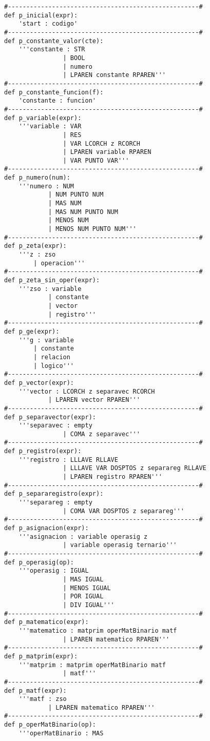 \begin{verbatim}
#----------------------------------------------------#
def p_inicial(expr):
	'start : codigo'
#----------------------------------------------------#
def p_constante_valor(cte):
	'''constante : STR	
				| BOOL
				| numero
				| LPAREN constante RPAREN'''
#----------------------------------------------------#
def p_constante_funcion(f):
	'constante : funcion'
#----------------------------------------------------#
def p_variable(expr):
	'''variable : VAR
				| RES
				| VAR LCORCH z RCORCH
				| LPAREN variable RPAREN
				| VAR PUNTO VAR'''
#----------------------------------------------------#
def p_numero(num):
	'''numero : NUM
			| NUM PUNTO NUM
			| MAS NUM
			| MAS NUM PUNTO NUM
			| MENOS NUM
			| MENOS NUM PUNTO NUM'''
#----------------------------------------------------#
def p_zeta(expr):
	'''z : zso
		| operacion'''
#----------------------------------------------------#
def p_zeta_sin_oper(expr):
	'''zso : variable
			| constante
			| vector
			| registro'''
#----------------------------------------------------#
def p_ge(expr):
	'''g : variable
		| constante 
		| relacion
		| logico'''
#----------------------------------------------------#
def p_vector(expr):
	'''vector : LCORCH z separavec RCORCH
			| LPAREN vector RPAREN'''			
#----------------------------------------------------#
def p_separavector(expr):
	'''separavec : empty
				| COMA z separavec'''
#----------------------------------------------------#
def p_registro(expr):
	'''registro : LLLAVE RLLAVE
				| LLLAVE VAR DOSPTOS z separareg RLLAVE
				| LPAREN registro RPAREN'''
#----------------------------------------------------#
def p_separaregistro(expr):
	'''separareg : empty
				| COMA VAR DOSPTOS z separareg'''
#----------------------------------------------------#
def p_asignacion(expr):
	'''asignacion : variable operasig z
				| variable operasig ternario'''
#----------------------------------------------------#
def p_operasig(op):
	'''operasig : IGUAL
				| MAS IGUAL
				| MENOS IGUAL
				| POR IGUAL
				| DIV IGUAL'''
#----------------------------------------------------#
def p_matematico(expr):
	'''matematico : matprim operMatBinario matf
				| LPAREN matematico RPAREN'''
#----------------------------------------------------#
def p_matprim(expr):		   
	'''matprim : matprim operMatBinario matf
				| matf'''
#----------------------------------------------------#
def p_matf(expr):
	'''matf : zso
			| LPAREN matematico RPAREN'''
#----------------------------------------------------#
def p_operMatBinario(op):
	'''operMatBinario : MAS

\end{verbatim}
